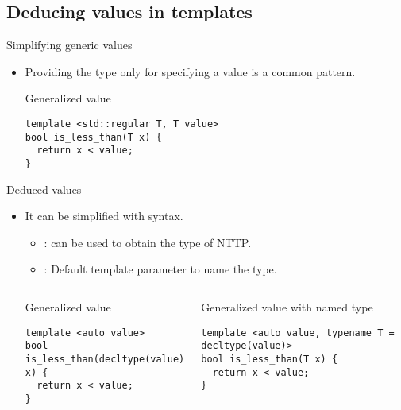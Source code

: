 \subsection{Deducing values in templates}

\begin{frame}[t,fragile]{Simplifying generic values}
\begin{itemize}
  \item Providing the type only for specifying a value is a common pattern.

\begin{block}{Generalized value}
\begin{lstlisting}
template <std::regular T, T value>
bool is_less_than(T x) {
  return x < value;
}
\end{lstlisting}
\end{block}

\end{itemize}
\end{frame}

\begin{frame}[t,fragile]{Deduced values}

\begin{itemize}
  \item It can be simplified with  syntax.
    \begin{itemize}
      \item {}:  can be used to obtain
            the type of NTTP.
      \item {}: Default template parameter to name the type.
    \end{itemize}

\begin{columns}[T]

\begin{block}{Generalized value}
\begin{lstlisting}
template <auto value>
bool is_less_than(decltype(value) x) {
  return x < value;
}
\end{lstlisting}
\end{block}

\pause
{}
\begin{block}{Generalized value with named type}
\begin{lstlisting}
template <auto value, typename T = decltype(value)>
bool is_less_than(T x) {
  return x < value;
}
\end{lstlisting}
\end{block}

\end{columns}

\end{itemize}
\end{frame}
